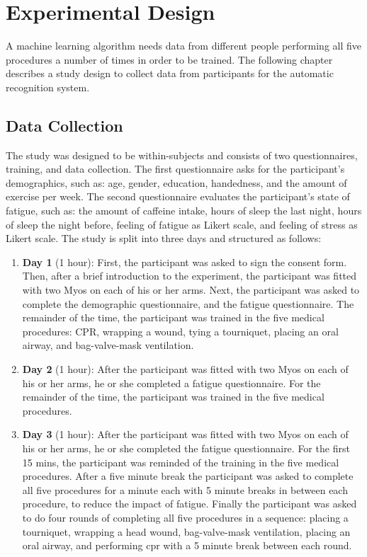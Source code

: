 \section{Experimental Design}
\label{sec:Experimental-Design}
A machine learning algorithm needs data from different people performing all five procedures a number of times in order to be trained. The following chapter describes a study design to collect data from participants for the automatic recognition system. 

\subsection{Data Collection}
\label{sec:Experimental-Design:Data-Collection}
The study was designed to be within-subjects and consists of two questionnaires, training, and data collection. The first questionnaire asks for the participant's demographics, such as: age, gender, education, handedness, and the amount of exercise per week. The second questionnaire evaluates the participant's state of fatigue, such as: the amount of caffeine intake, hours of sleep the last night, hours of sleep the night before, feeling of fatigue as Likert scale, and feeling of stress as Likert scale. The study is split into three days and structured as follows:
\begin{enumerate}
	\item \textbf{Day 1} (1 hour): First, the participant was asked to sign the consent form. Then, after a brief introduction to the experiment, the participant was fitted with two Myos on each of his or her arms. Next, the participant was asked to complete the demographic questionnaire, and the fatigue questionnaire. The remainder of the time, the participant was trained in the five medical procedures: CPR, wrapping a wound, tying a tourniquet, placing an oral airway, and bag-valve-mask ventilation.
	\item \textbf{Day 2} (1 hour): After the participant was fitted with two Myos on each of his or her arms, he or she completed a fatigue questionnaire. For the remainder of the time, the participant was trained in the five medical procedures.
	\item \textbf{Day 3} (1 hour): After the participant was fitted with two Myos on each of his or her arms, he or she completed the fatigue questionnaire. For the first 15 mins, the participant was reminded of the training in the five medical procedures.
	After a five minute break the participant was asked to complete all five procedures for a minute each with 5 minute breaks in between each procedure, to reduce the impact of fatigue. Finally the participant was asked to do four rounds of completing all five procedures in a sequence: placing a tourniquet, wrapping a head wound, bag-valve-mask ventilation, placing an oral airway, and performing cpr with a 5 minute break between each round.
\end{enumerate}

